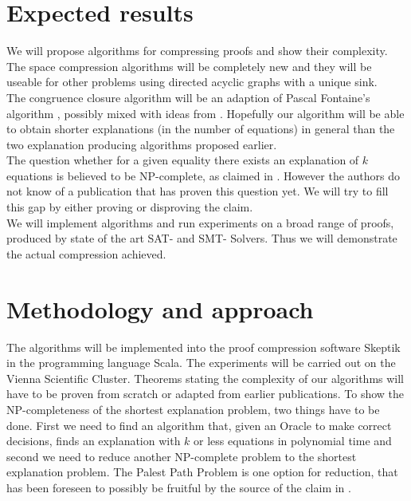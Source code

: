 \section{Expected results}

We will propose algorithms for compressing proofs and show their complexity.\\
The space compression algorithms will be completely new and they will be useable for other problems using directed acyclic graphs with a unique sink.\\
The congruence closure algorithm will be an adaption of Pascal Fontaine's algorithm \cite{Fontaine2004}, possibly mixed with ideas from \cite{TODO: BarceLogic CC algorithm}. 
Hopefully our algorithm will be able to obtain shorter explanations (in the number of equations) in general than the two explanation producing algorithms proposed earlier.\\
The question whether for a given equality there exists an explanation of $k$ equations is believed to be NP-complete, as claimed in \cite{Nieuwenhuis2005a,Nieuwenhuis2007}.
However the authors do not know of a publication that has proven this question yet.
We will try to fill this gap by either proving or disproving the claim.\\
We will implement algorithms and run experiments on a broad range of proofs, produced by state of the art SAT- and SMT- Solvers.
Thus we will demonstrate the actual compression achieved.

\section{Methodology and approach}

The algorithms will be implemented into the proof compression software Skeptik \cite{Boudou} in the programming language Scala.
The experiments will be carried out on the Vienna Scientific Cluster.
Theorems stating the complexity of our algorithms will have to be proven from scratch or adapted from earlier publications.
To show the NP-completeness of the shortest explanation problem, two things have to be done. 
First we need to find an algorithm that, given an Oracle to make correct decisions, finds an explanation with $k$ or less equations in polynomial time and second we need to reduce another NP-complete problem to the shortest explanation problem.
The Palest Path Problem \cite{Tiwari} is one option for reduction, that has been foreseen to possibly be fruitful by the source of the claim in \cite{Nieuwenhuis2005a,Nieuwenhuis2007}.

